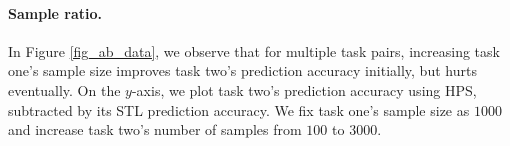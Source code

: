 
\paragraph{Sample ratio.}
In Figure \ref{fig_ab_data}, we observe that for multiple task pairs, increasing task one's sample size improves task two's prediction accuracy initially, but hurts eventually.
On the $y$-axis, we plot task two's prediction accuracy using HPS, subtracted by its STL prediction accuracy.
We fix task one's sample size as $1000$ and increase task two's number of samples from $100$ to $3000$.


